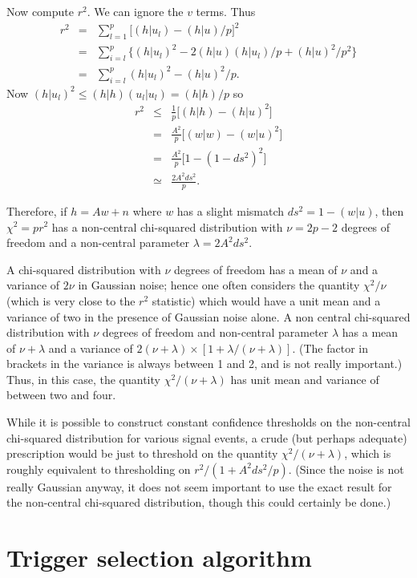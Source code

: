 Now compute $r^2$.  We can ignore the $v$ terms.  Thus
\begin{eqnarray}
  r^2 &=& \sum_{l=1}^p \bigl[ (h|u_l) - (h|u)/p \bigr]^2 \nonumber \\
      &=& \sum_{i=l}^p \bigl\{ (h|u_l)^2 - 2(h|u)(h|u_l)/p + (h|u)^2/p^2 \bigr\}
          \nonumber \\
      &=& \sum_{i=l}^p (h|u_l)^2 - (h|u)^2/p.
\end{eqnarray}
Now $(h|u_l)^2\le(h|h)(u_l|u_l)=(h|h)/p$ so
\begin{eqnarray}
  r^2 &\le& \frac{1}{p}\bigl[ (h|h) - (h|u)^2 \bigr] \nonumber \\
      &=& \frac{A^2}{p}\bigl[ (w|w) - (w|u)^2 \bigr] \nonumber \\
      &=& \frac{A^2}{p}\bigl[ 1 - ( 1 - ds^2 )^2 \bigr] \nonumber \\
      &\simeq& \frac{2A^2ds^2}{p}.
\end{eqnarray}

Therefore, if $h=Aw+n$ where $w$ has a slight mismatch $ds^2=1-(w|u)$, then
$\chi^2=pr^2$ has a non-central chi-squared distribution with $\nu=2p-2$
degrees of freedom and a non-central parameter $\lambda=2A^2ds^2$.

A chi-squared distribution with $\nu$ degrees of freedom has a mean of
$\nu$ and a variance of $2\nu$ in Gaussian noise; hence one often considers
the quantity $\chi^2/\nu$ (which is very close to the $r^2$ statistic) which
would have a unit mean and a variance of two in the presence of Gaussian
noise alone.  A non central chi-squared distribution with $\nu$ degrees of
freedom and non-central parameter $\lambda$ has a mean of $\nu+\lambda$ and
a variance of $2(\nu+\lambda)\times[1+\lambda/(\nu+\lambda)]$.  (The factor
in brackets in the variance is always between 1 and 2, and is not really
important.)  Thus, in this case, the quantity $\chi^2/(\nu+\lambda)$ has
unit mean and variance of between two and four.

While it is possible to construct constant confidence thresholds on the
non-central chi-squared distribution for various signal events, a crude
(but perhaps adequate) prescription would be just to threshold on the
quantity $\chi^2/(\nu+\lambda)$, which is roughly equivalent to thresholding
on $r^2/(1+A^2ds^2/p)$.  (Since the noise is not really Gaussian anyway,
it does not seem important to use the exact result for the non-central
chi-squared distribution, though this could certainly be done.)

\section{Trigger selection algorithm}
\label{ss:trigger}

